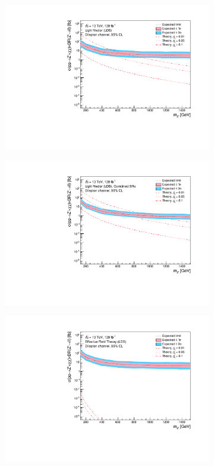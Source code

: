 \documentclass[12pt, a4paper]{book}
\begin{document}
\begin{figure}[!ht]
\begin{subfigure}[b]{0.49\textwidth}
      \includegraphics[width=1\textwidth]{Limits/LV_LDS/mass_exclusion_comb.pdf}
   \end{subfigure}
   \hfill
   \begin{subfigure}[b]{0.49\textwidth}
      \centering
      \includegraphics[width=1\textwidth]{Limits/Model_independent/LV_LDS/mass_exclusion_comb.pdf}
   \end{subfigure}
   \hfill
	\begin{subfigure}[b]{0.49\textwidth}
      \centering
      \includegraphics[width=1\textwidth]{Limits/EFT_LDS/mass_exclusion_comb.pdf}

\end{subfigure}
\end{figure}
\end{document}
